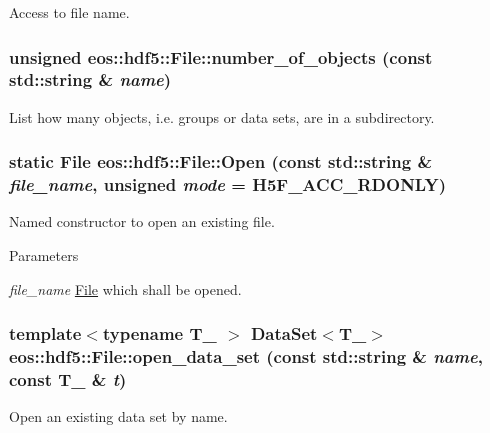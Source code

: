 Access to file name. \hypertarget{classeos_1_1hdf5_1_1File_ab95523c1691b5c1bde956a13a04739fc}{
\subsubsection[{number\_\-of\_\-objects}]{\setlength{\rightskip}{0pt plus 5cm}unsigned eos::hdf5::File::number\_\-of\_\-objects (const std::string \& {\em name})}}
\label{classeos_1_1hdf5_1_1File_ab95523c1691b5c1bde956a13a04739fc}


List how many objects, i.e. groups or data sets, are in a subdirectory. \hypertarget{classeos_1_1hdf5_1_1File_a2db8559898bd4f68d16a56760952c195}{
\subsubsection[{Open}]{\setlength{\rightskip}{0pt plus 5cm}static {\bf File} eos::hdf5::File::Open (const std::string \& {\em file\_\-name}, \/  unsigned {\em mode} = {\ttfamily H5F\_\-ACC\_\-RDONLY})}}
\label{classeos_1_1hdf5_1_1File_a2db8559898bd4f68d16a56760952c195}
Named constructor to open an existing file.


\begin{DoxyParams}{Parameters}
\item[{\em file\_\-name}]\hyperlink{classeos_1_1hdf5_1_1File}{File} which shall be opened. \end{DoxyParams}
\hypertarget{classeos_1_1hdf5_1_1File_ae5e5e823024ff7629788895eec1f33f2}{
\subsubsection[{open\_\-data\_\-set}]{\setlength{\rightskip}{0pt plus 5cm}template$<$typename T\_\- $>$ {\bf DataSet}$<$T\_\-$>$ eos::hdf5::File::open\_\-data\_\-set (const std::string \& {\em name}, \/  const T\_\- \& {\em t})}}
\label{classeos_1_1hdf5_1_1File_ae5e5e823024ff7629788895eec1f33f2}
Open an existing data set by name.


